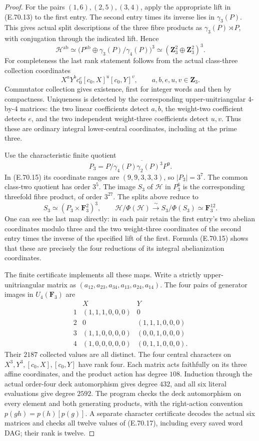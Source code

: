 \begin{proof}
For the pairs $(1,6),(2,5),(3,4)$, apply the
appropriate lift in (E.70.13) to the first entry.
The second entry times its inverse lies in
$\gamma_3(P)$. This gives actual split descriptions
of the three fibre products as
$\gamma_3(P)\rtimes P$, with conjugation through
the indicated lift. Hence
\[
 \mathscr H^{\mathrm{ab}}
   \simeq\bigl(P^{\mathrm{ab}}\oplus
                    \gamma_3(P)/\gamma_4(P)\bigr)^3
   \simeq(\mathbf Z_3^2\oplus\mathbf Z_3^2)^3.
 \tag{E.70.14}
\]
For completeness the last rank statement follows
from the actual class-three collection coordinates
\[
 X^aY^b c_0^e[c_0,X]^u[c_0,Y]^v,
                     \qquad a,b,e,u,v\in\mathbf Z_3.
 \tag{E.70.15}
\]
Commutator collection gives existence, first for
integer words and then by compactness. Uniqueness
is detected by the corresponding upper-unitriangular
$4$-by-$4$ matrices: the two linear coefficients
detect $a,b$, the weight-two coefficient detects
$e$, and the two independent weight-three
coefficients detect $u,v$. Thus these are ordinary
integral lower-central coordinates, including at
the prime three.

Use the characteristic finite quotient
\[
 P_3=P/\overline{\gamma_4(P)\gamma_2(P)^3P^9}.
 \tag{E.70.16}
\]
In (E.70.15) its coordinate ranges are
$(9,9,3,3,3)$, so $|P_3|=3^7$. The common
class-two quotient has order $3^5$. The image
$S_3$ of $\mathscr H$ in $P_3^6$ is the corresponding
threefold fibre product, of order $3^{27}$.
The splits above reduce to
\[
 S_3\simeq(P_3\times\mathbf F_3^2)^3,
 \qquad
 \mathscr H/\Phi(\mathscr H)
            \xrightarrow{\ \sim\ }S_3/\Phi(S_3)
            \simeq\mathbf F_3^{12}.
 \tag{E.70.17}
\]
One can see the last map directly: in each pair
retain the first entry's two abelian coordinates
modulo three and the two weight-three coordinates
of the second entry times the inverse of the
specified lift of the first. Formula (E.70.15)
shows that these are precisely the four reductions
of its integral abelianization coordinates.

The finite certificate implements all these maps.
Write a strictly upper-unitriangular matrix as
$(a_{12},a_{23},a_{34},a_{13},a_{24},a_{14})$.
The four pairs of generator images in $U_4(\mathbf F_3)$ are
\[
 \begin{array}{c|c|c}
 &X&Y\\ \hline
 1&(1,1,1,0,0,0)&0\\
 2&0&(1,1,1,0,0,0)\\
 3&(1,1,0,0,0,0)&(0,0,1,0,0,0)\\
 4&(1,0,0,0,0,0)&(0,1,1,0,0,0).
 \end{array}
 \tag{E.70.18}
\]
Their $2187$ collected values are all distinct.
The four central characters on $X^3,Y^3,[c_0,X],
[c_0,Y]$ have rank four. Each matrix acts faithfully
on its three affine coordinates, and the product
action has degree $108$. Induction through the
actual order-four deck automorphism gives degree
$432$, and all six literal evaluations give degree
$2592$. The program checks the deck automorphism
on every element and both generating products,
with the right-action convention
$p(gh)=p(h)[p(g)]$. A separate character certificate
decodes the actual six matrices and checks all
twelve values of (E.70.17), including every saved
word DAG; their rank is twelve.


\end{proof}

